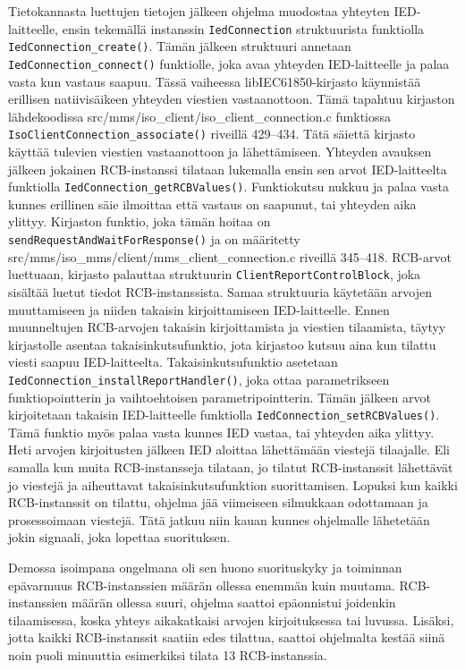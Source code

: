 Tietokannasta luettujen tietojen jälkeen ohjelma muodostaa yhteyten IED-laitteelle, ensin tekemällä instanssin \texttt{IedConnection} struktuurista funktiolla \texttt{IedConnection\_create()}. Tämän jälkeen struktuuri annetaan \texttt{IedConnection\_connect()} funktiolle, joka avaa yhteyden IED-laitteelle ja palaa vasta kun vastaus saapuu. Tässä vaiheessa libIEC61850-kirjasto käynnistää erillisen natiivisäikeen yhteyden viestien vastaanottoon. Tämä tapahtuu kirjaston lähdekoodissa src/mms/iso\_client/iso\_client\_connection.c funktiossa \texttt{IsoClientConnection\_associate()} riveillä 429--434. Tätä säiettä kirjasto käyttää tulevien viestien vastaanottoon ja lähettämiseen. Yhteyden avauksen jälkeen jokainen RCB-instanssi tilataan lukemalla ensin sen arvot IED-laitteelta funktiolla \texttt{IedConnection\_getRCBValues()}. Funktiokutsu nukkuu ja palaa vasta kunnes erillinen säie ilmoittaa että vastaus on saapunut, tai yhteyden aika ylittyy. Kirjaston funktio, joka tämän hoitaa on \texttt{sendRequestAndWaitForResponse()} ja on määritetty src/mms/iso\_mms/client/mms\_client\_connection.c riveillä 345--418. RCB-arvot luettuaan, kirjasto palauttaa struktuurin \texttt{ClientReportControlBlock}, joka sisältää luetut tiedot RCB-instanssista. Samaa struktuuria käytetään arvojen muuttamiseen ja niiden takaisin kirjoittamiseen IED-laitteelle. Ennen muunneltujen RCB-arvojen takaisin kirjoittamista ja viestien tilaamista, täytyy kirjastolle asentaa takaisinkutsufunktio, jota kirjastoo kutsuu aina kun tilattu viesti saapuu IED-laitteelta. Takaisinkutsufunktio asetetaan \texttt{IedConnection\_installReportHandler()}, joka ottaa parametrikseen funktiopointterin ja vaihtoehtoisen parametripointterin. Tämän jälkeen arvot kirjoitetaan takaisin IED-laitteelle funktiolla \texttt{IedConnection\_setRCBValues()}. Tämä funktio myös palaa vasta kunnes IED vastaa, tai yhteyden aika ylittyy. Heti arvojen kirjoitusten jälkeen IED aloittaa lähettämään viestejä tilaajalle. Eli samalla kun muita RCB-instansseja tilataan, jo tilatut RCB-instanssit lähettävät jo viestejä ja aiheuttavat takaisinkutsufunktion suorittamisen. Lopuksi kun kaikki RCB-instanssit on tilattu, ohjelma jää viimeiseen silmukkaan odottamaan ja prosessoimaan viestejä. Tätä jatkuu niin kauan kunnes ohjelmalle lähetetään jokin signaali, joka lopettaa suorituksen.

Demossa isoimpana ongelmana oli sen huono suorituskyky ja toiminnan epävarmuus RCB-instanssien määrän ollessa enemmän kuin muutama. RCB-instanssien määrän ollessa suuri, ohjelma saattoi epäonnistui joidenkin tilaamisessa, koska yhteys aikakatkaisi arvojen kirjoituksessa tai luvussa. Lisäksi, jotta kaikki RCB-instanssit saatiin edes tilattua, saattoi ohjelmalta kestää siinä noin puoli minuuttia esimerkiksi tilata 13 RCB-instanssia.

